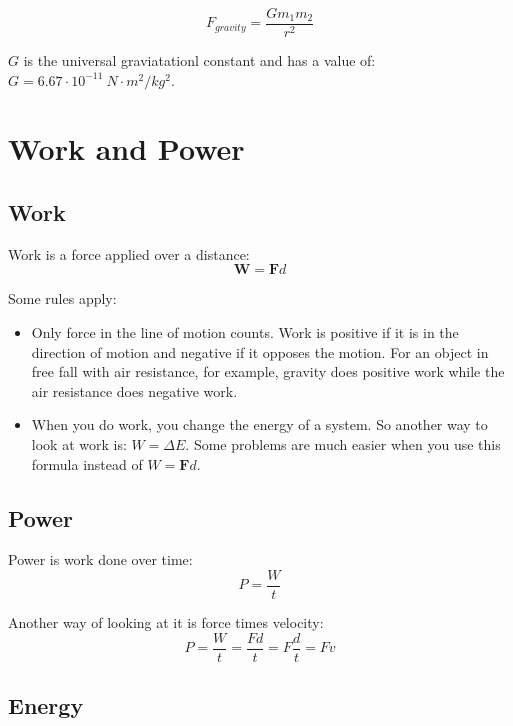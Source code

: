 \documentclass{exam}
\begin{document}
\[
  F_{gravity} = \frac{Gm_1m_2}{r^2}
\]

$G$ is the universal graviatationl constant and has a value of: $G = 6.67 \cdot 10^{-11} \ N \cdot m^2/kg^2$.

\section{Work and Power}

\subsection{Work}
Work is a force applied over a distance: 
\[
\mathbf{W} = \mathbf{F}d
\]

Some rules apply:
\begin{itemize}
\item Only force in the line of motion counts.  Work is positive if it is in the direction of motion and negative
  if it opposes the motion.  For an object in free fall with air resistance, for example, gravity does positive work
  while the air resistance does negative work.


\item When you do work, you change the energy of a system.  So another way to look at work is: $W = \Delta E$.  Some
  problems are much easier when you use this formula instead of $W = \mathbf{F}d$.
\end{itemize}

\subsection{Power}
Power is work done over time:
\[
  P = \frac{W}{t}
\]

Another way of looking at it is force times velocity:
\[
  P = \frac{W}{t} = \frac{Fd}{t} = F \frac{d}{t} = Fv
\]

\subsection{Energy}
\end{document}
